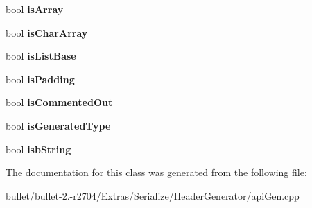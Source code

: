 \begin{DoxyCompactItemize}
\item 
\hypertarget{classb_variable_a2c842326acf1e3042b72f583bb9c24ef}{bool {\bfseries is\+Array}}\label{classb_variable_a2c842326acf1e3042b72f583bb9c24ef}

\item 
\hypertarget{classb_variable_ad2eb2d318062fe08a4c2b81c6b488eb6}{bool {\bfseries is\+Char\+Array}}\label{classb_variable_ad2eb2d318062fe08a4c2b81c6b488eb6}

\item 
\hypertarget{classb_variable_a01c41775b85af16532cb59454ce89825}{bool {\bfseries is\+List\+Base}}\label{classb_variable_a01c41775b85af16532cb59454ce89825}

\item 
\hypertarget{classb_variable_abaf0fdd8c04314f98cea60fe1e275b2e}{bool {\bfseries is\+Padding}}\label{classb_variable_abaf0fdd8c04314f98cea60fe1e275b2e}

\item 
\hypertarget{classb_variable_af895e3a048c39b86792bedeb4f364ead}{bool {\bfseries is\+Commented\+Out}}\label{classb_variable_af895e3a048c39b86792bedeb4f364ead}

\item 
\hypertarget{classb_variable_a8c6dafcc313f19cff27b06797614d750}{bool {\bfseries is\+Generated\+Type}}\label{classb_variable_a8c6dafcc313f19cff27b06797614d750}

\item 
\hypertarget{classb_variable_a8d942e62950f64ac6f4eb9f64173de6e}{bool {\bfseries isb\+String}}\label{classb_variable_a8d942e62950f64ac6f4eb9f64173de6e}

\end{DoxyCompactItemize}


The documentation for this class was generated from the following file\+:\begin{DoxyCompactItemize}
\item 
bullet/bullet-\/2.-\/r2704/\+Extras/\+Serialize/\+Header\+Generator/api\+Gen.\+cpp\end{DoxyCompactItemize}
